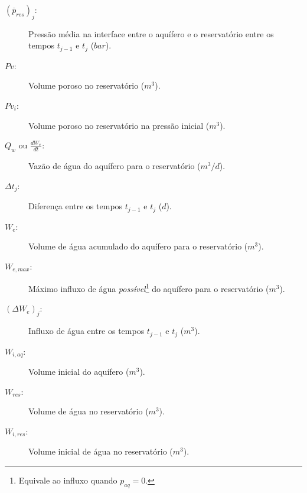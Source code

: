 \documentclass[final,5p]{elsarticle}
\numberwithin{equation}{section}
\begin{document}
\begin{description}
    \item[$(\overline{p}_{res})_j$:]Pressão média na interface entre o aquífero e o reservatório entre os tempos $t_{j-1}$ e $t_j$ ($bar$).
    \item[$Pv$:]Volume poroso no reservatório ($m^3$).
    \item[$Pv_i$:]Volume poroso no reservatório na pressão inicial ($m^3$).
    \item[$Q_w$ ou $\frac{dW_e}{dt}$:]Vazão de água do aquífero para o reservatório ($m^3/d$).
    \item[$\Delta t_j$:]Diferença entre os tempos $t_{j-1}$ e $t_j$ ($d$).
    \item[$W_e$:]Volume de água acumulado do aquífero para o reservatório ($m^3$).
    \item[$W_{e,max}$:]Máximo influxo de água \emph{possível}\footnote{Equivale ao influxo quando $p_{aq}=0$.} do aquífero para o reservatório ($m^3$).
    \item[$(\Delta W_e)_j$:]Influxo de água entre os tempos $t_{j-1}$ e $t_j$ ($m^3$).
    \item[$W_{i,aq}$:]Volume inicial do aquífero ($m^3$).
    \item[$W_{res}$:]Volume de água no reservatório ($m^3$).
    \item[$W_{i,res}$:]Volume inicial de água no reservatório ($m^3$).
\end{description}












\end{document}
